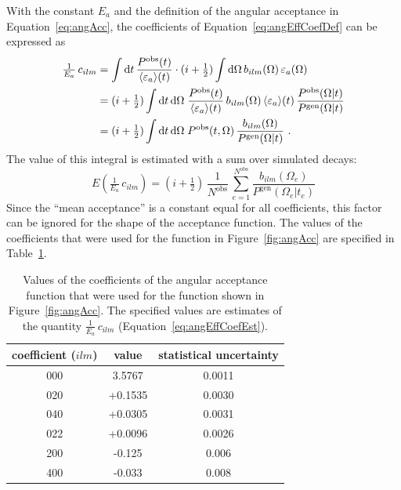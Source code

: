 With the constant $E_a$ and the definition of the angular acceptance in Equation~\ref{eq:angAcc}, the coefficients of
Equation~\ref{eq:angEffCoefDef} can be expressed as
\begin{equation}
  \label{eq:angAccInt}
  \begin{split}
    \tfrac{1}{E_a}\, c_{ilm} &= \int\mathrm{d} t\, \frac{P^\text{obs}(t)}{\langle\varepsilon_a\rangle(t)}
                                \cdot (i+\tfrac{1}{2}) \int\mathrm{d}\Omega\,b_{ilm}(\Omega)\, \varepsilon_a(\Omega) \\
                             &= (i+\tfrac{1}{2}) \int\mathrm{d} t\, \mathrm{d}\Omega\; \frac{P^\text{obs}(t)}{\langle\varepsilon_a\rangle(t)}\,
                                b_{ilm}(\Omega)\, \langle\varepsilon_a\rangle(t)\, \frac{P^\text{obs}(\Omega|t)}{P^\text{gen}(\Omega|t)} \\
                             &= (i+\tfrac{1}{2}) \int\mathrm{d} t\, \mathrm{d}\Omega\; P^\text{obs}(t,\Omega)\,
                                \frac{b_{ilm}(\Omega)}{P^\text{gen}(\Omega|t)} \ .
  \end{split}
\end{equation}
The value of this integral is estimated with a sum over simulated decays:
\begin{equation}
  E\left( \tfrac{1}{E_a}\, c_{ilm} \right)
      = (i + \tfrac{1}{2})\, \frac{1}{N^\text{obs}}\, \sum_{e=1}^{N^\text{obs}}\frac{b_{ilm}(\Omega_e)}{P^\text{gen}(\Omega_e|t_e)}
  \label{eq:angEffCoefEst}
\end{equation}
Since the ``mean acceptance'' is a constant equal for all coefficients, this factor can be ignored for the shape of the acceptance
function. The values of the coefficients that were used for the function in Figure~\ref{fig:angAcc} are specified in
Table~\ref{tab:angEffCoefs}.
\begin{table}[htbp]
  \centering
  \caption{Values of the coefficients of the angular acceptance function that were used for the function shown in Figure~\ref{fig:angAcc}.
           The specified values are estimates of the quantity $\tfrac{1}{E_a}\, c_{ilm}$ (Equation~\ref{eq:angEffCoefEst}).}
  \label{tab:angEffCoefs}
  \begin{tabular}{ccc}
    \hline
    coefficient ($ilm$)  &  value  &  statistical uncertainty  \\
    \hline
    000  &   3.5767  &  0.0011  \\
    020  &  +0.1535  &  0.0030  \\
    040  &  +0.0305  &  0.0031  \\
    022  &  +0.0096  &  0.0026  \\
    200  &  -0.125   &  0.006   \\
    400  &  -0.033   &  0.008   \\
    \hline
  \end{tabular}
\end{table}

